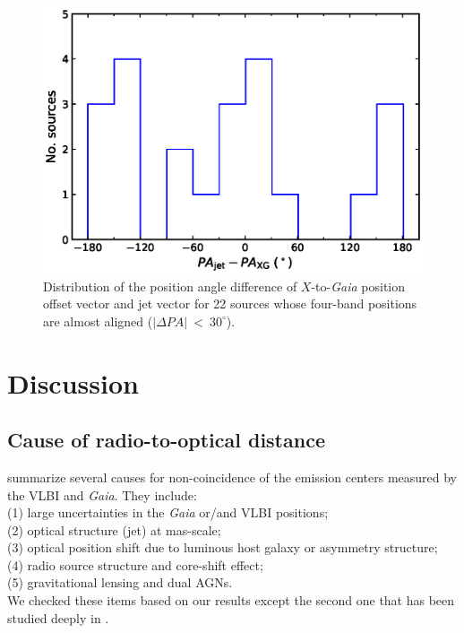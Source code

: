 \documentclass[referee]{aa}        %
\begin{document}

    \begin{figure}[hbtp]
        \centering
        \includegraphics[width=0.7\columnwidth]{figs/jet-pa-com}
        \caption[]{\label{fig:jet-pa-com}
            Distribution of the position angle difference of $X$-to-\textit{Gaia} position offset vector and jet vector for 22 sources whose four-band positions are almost aligned ($|\Delta PA|~<~30^{\circ}$).
        }
    \end{figure}


\section{Discussion} \label{subsec:discussion}
%

\subsection{Cause of radio-to-optical distance} \label{subsec:cause-of-VG}
%
    \citet{2017MNRAS.471.3775P} summarize several causes for non-coincidence of the emission centers measured by the VLBI and \textit{Gaia}.
    They include:\\
    (1) large uncertainties in the \textit{Gaia} or/and VLBI positions;\\
    (2) optical structure (jet) at mas-scale; \\
    (3) optical position shift due to luminous host galaxy or asymmetry structure;\\
    (4) radio source structure and core-shift effect;\\
    (5) gravitational lensing and dual AGNs.\\
    We checked these items based on our results except the second one that has been studied deeply in \citet{2017A&A...598L...1K,2017MNRAS.467L..71P,2017MNRAS.471.3775P,2019MNRAS.482.3023P,2019ApJ...871..143P,2020MNRAS.493L..54K}. %
\end{document}
